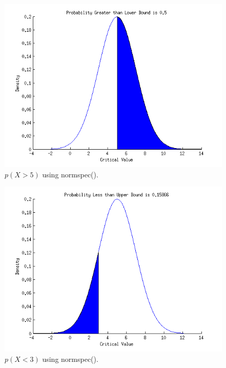 \documentclass[12pt,a4paper]{article}
\begin{document}
\begin{figure}[ht!]
\includegraphics[scale=1]{greater_than_mean_217.png}
\caption{$p(X>5)$ using normspec().}
\label{fig2:2.17}
\end{figure}

\begin{figure}[ht!]
\includegraphics[scale=1]{less_than_x_217.png}
\caption{$p(X<3)$ using normspec().}
\label{fig3:2.17}
\end{figure}

\FloatBarrier
\end{document}
